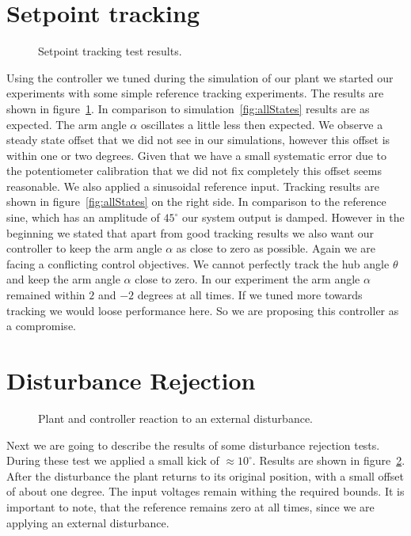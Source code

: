 \documentclass[ twoside,openright,titlepage,numbers=noenddot,headinclude,%
                footinclude=true,cleardoublepage=empty,abstractoff, %
                BCOR=5mm,paper=a4,fontsize=11pt,%
                ngerman,american,%
                ]{scrreprt}
\begin{document}
{\section{Setpoint tracking}
\begin{figure}


\caption{Setpoint tracking test results.}
\label{fig:setPoint}
\end{figure}
Using the controller we tuned during the simulation of our plant we started our experiments with some simple reference tracking experiments. The results are shown in figure~\ref{fig:setPoint}. In comparison to simulation~\ref{fig:allStates} results are as expected. The arm angle $\alpha$ oscillates a little less then expected. We observe a steady state offset that we did not see in our simulations, however this offset is within one or two degrees. Given that we have a small systematic error due to the potentiometer calibration that we did not fix completely this offset seems reasonable. We also applied a sinusoidal reference input. Tracking results are shown in figure~\ref{fig:allStates} on the right side. In comparison to the reference sine, which has an amplitude of $45^\circ$ our system output is damped. However in the beginning we stated that apart from good tracking results we also want our controller to keep the arm angle $\alpha$ as close to zero as possible. Again we are facing a conflicting control objectives. We cannot perfectly track the hub angle $\theta$ and keep the arm angle $\alpha$ close to zero. In our experiment the arm angle $\alpha$ remained within $2$ and $-2$ degrees at all times. If we tuned more towards tracking we would loose performance here. So we are proposing this controller as a compromise. 

\section{Disturbance Rejection}
\begin{figure}

\caption{Plant and controller reaction to an external disturbance.}
\label{fig:disturbance}
\end{figure}
Next we are going to describe the results of some disturbance rejection tests. During these test we applied a small kick of $\approx 10^\circ$. Results are shown in figure~\ref{fig:disturbance}. After the disturbance the plant returns to its original position, with a small offset of about one degree. The input voltages remain withing the required bounds. It is important to note, that the reference remains zero at all times, since we are applying an external disturbance.

}
\end{document}
